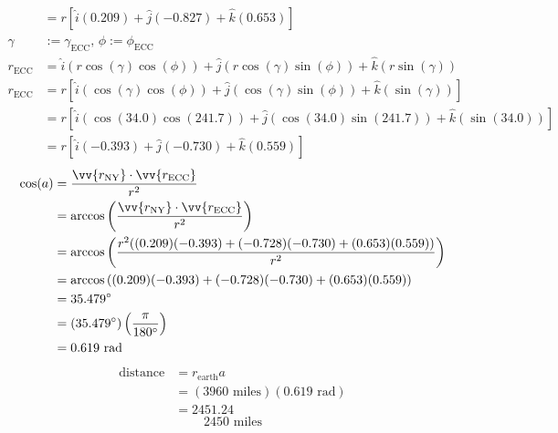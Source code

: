 \documentclass{article}
\begin{document}
\begin{enumerate}[label=(\alph*)]
\begin{align*}
                          & = r[\hat{i}(0.209) + \hat{j}(-0.827) + \hat{k}(0.653)] \\
            \gamma & := \gamma_{\text{ECC}} \text{, } \phi := \phi_{\text{ECC}} \\
            r_{\text{ECC}} & = \hat{i}(r\cos(\gamma)\cos(\phi)) + \hat{j}(r\cos(\gamma)\sin(\phi)) + \hat{k}(r\sin(\gamma)) \\
            r_{\text{ECC}} & = r[\hat{i}(\cos(\gamma)\cos(\phi)) + \hat{j}(\cos(\gamma)\sin(\phi)) + \hat{k}(\sin(\gamma))] \\
                           & = r[\hat{i}(\cos(34.0)\cos(241.7)) + \hat{j}(\cos(34.0)\sin(241.7)) + \hat{k}(\sin(34.0))] \\
                           & = r[\hat{i}(-0.393) + \hat{j}(-0.730) + \hat{k}(0.559)]
        \end{align*}
        \begin{align*}
            \cos(a) & = \frac{\vv{r_\text{NY}} \cdot \vv{r_\text{ECC}}}{r^2} \\
                    & = \arccos\left(\frac{\vv{r_\text{NY}} \cdot \vv{r_\text{ECC}}}{r^2}\right) \\
                    & = \arccos\left(\frac{r^2((0.209)(-0.393) + (-0.728)(-0.730) + (0.653)(0.559))}{r^2}\right) \\
                    & = \arccos\left((0.209)(-0.393) + (-0.728)(-0.730) + (0.653)(0.559)\right) \\
                    & = 35.479\degree \\
                    & = (35.479\degree)\left(\frac{\pi}{180\degree}\right) \\
                    & = 0.619 \text{ rad}
        \end{align*}
        \begin{align*}
            \text{distance} & = r_{\text{earth}}a \\
                            & = (3960 \text{ miles})(0.619 \text{ rad}) \\
                            & = 2451.24
        \end{align*}
        \begin{equation*}
            \boxed{2450 \text{ miles}}
        \end{equation*}
\end{enumerate}
\end{document}
